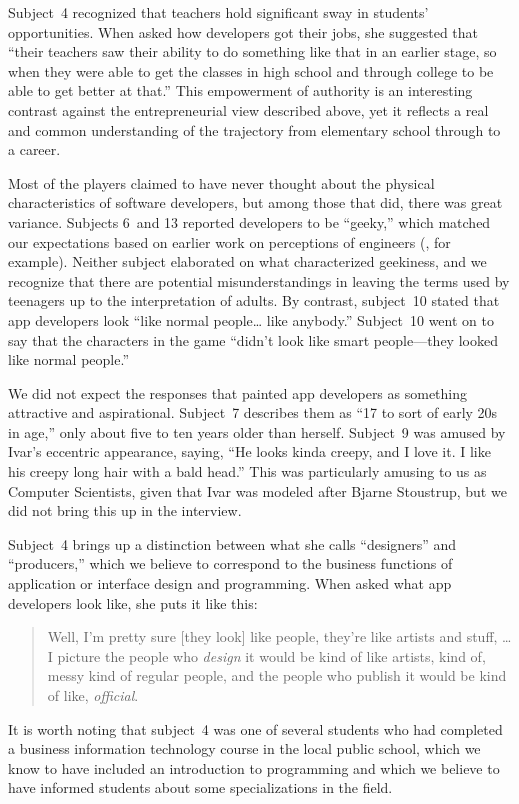 \documentclass[letterpaper]{article}
\begin{document}
Subject~4 recognized that teachers hold significant sway in students'
opportunities. When asked how developers got their jobs, she suggested
that ``their teachers saw their ability to do something
like that in an earlier stage, so when they were able to get
the classes in high school and through college to be able to get better
at that.''
This empowerment of authority is an interesting contrast
against the entrepreneurial view described above,
yet it reflects a real and common understanding of the trajectory
from elementary school through to a career.




Most of the players claimed to have never thought about the physical
characteristics of software developers, but among those that did,
there was great variance.  Subjects 6~and 13 reported developers to be
``geeky,'' which matched our expectations based on earlier work on
perceptions of engineers (\citet{Margolis2003}, for example). Neither
subject elaborated on what characterized geekiness, and we recognize
that there are potential misunderstandings in leaving the terms used
by teenagers up to the interpretation of adults.  
By contrast,
subject~10 stated that app developers look ``like normal
people\ldots{} like anybody.''
Subject~10 went on to say that the characters in the game
``didn't look like smart people---they looked like normal people.''

We did not expect the responses that painted app developers as something
attractive and aspirational. Subject~7 describes them as ``17 to sort of
early 20s in age,'' only about five to ten years older than herself.
Subject~9 was amused by Ivar's eccentric appearance, saying, ``He looks
kinda creepy, and I love it. I like his creepy long hair with a bald head.''
This was particularly amusing to us as Computer Scientists, given that
Ivar was modeled after Bjarne Stoustrup, but we did not bring this up
in the interview.

Subject~4 brings up a distinction between what she calls ``designers''
and ``producers,'' which we believe to correspond to the business functions
of application or interface design and programming. 
When asked what app developers look like, she puts it like this:
\begin{quote}
Well, I'm pretty sure [they look] like people, they're like artists
and stuff, \ldots{} I picture the people who \textit{design} it would
be kind of like artists, kind of, messy kind of regular people, and the
people who publish it would be kind of like, \textit{official}.
\end{quote}
It is worth noting that subject~4 was one of several students who had
completed a business information technology course in the local public
school, which we know to have included an introduction to programming
and which we believe to have informed students about some
specializations in the field.
\end{document}

